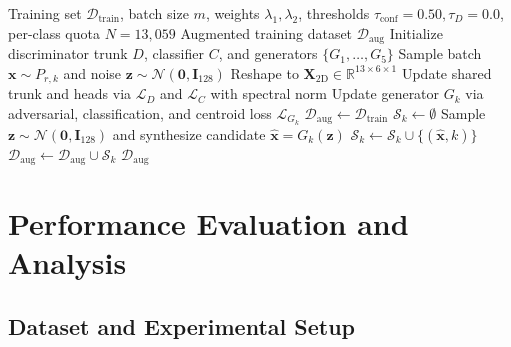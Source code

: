 \documentclass[conference]{IEEEtran}
\begin{document}
\begin{algorithm}[t]
\caption{TMG-GAN Training and Proposed Sample Quality Filtering}
\label{alg:tmg_gan}
\begin{algorithmic}[1]
\REQUIRE Training set $\mathcal{D}_{\text{train}}$, batch size $m$, weights $\lambda_1, \lambda_2$, thresholds $\tau_{\text{conf}} = 0.50, \tau_D = 0.0$, per-class quota $N = 13{,}059$
\ENSURE Augmented training dataset $\mathcal{D}_{\text{aug}}$
\STATE Initialize discriminator trunk $D$, classifier $C$, and generators $\{G_1, \dots, G_5\}$
        \STATE Sample batch $\mathbf{x} \sim P_{r,k}$ and noise $\mathbf{z} \sim \mathcal{N}(\mathbf{0}, \mathbf{I}_{128})$
        \STATE Reshape to $\mathbf{X}_{\text{2D}} \in \mathbb{R}^{13 \times 6 \times 1}$
        \STATE Update shared trunk and heads via $\mathcal{L}_D$ and $\mathcal{L}_C$ with spectral norm
        \STATE Update generator $G_k$ via adversarial, classification, and centroid loss $\mathcal{L}_{G_k}$
    \ENDFOR
\ENDFOR
\STATE $\mathcal{D}_{\text{aug}} \leftarrow \mathcal{D}_{\text{train}}$
    \STATE $\mathcal{S}_k \leftarrow \emptyset$
        \STATE Sample $\mathbf{z} \sim \mathcal{N}(\mathbf{0}, \mathbf{I}_{128})$ and synthesize candidate $\hat{\mathbf{x}} = G_k(\mathbf{z})$
            \STATE $\mathcal{S}_k \leftarrow \mathcal{S}_k \cup \{(\hat{\mathbf{x}}, k)\}$ 
        \ENDIF
    \ENDWHILE
    \STATE $\mathcal{D}_{\text{aug}} \leftarrow \mathcal{D}_{\text{aug}} \cup \mathcal{S}_k$
\ENDFOR
\RETURN $\mathcal{D}_{\text{aug}}$
\end{algorithmic}
\end{algorithm}


\section{Performance Evaluation and Analysis}

\subsection{Dataset and Experimental Setup}
\end{document}
